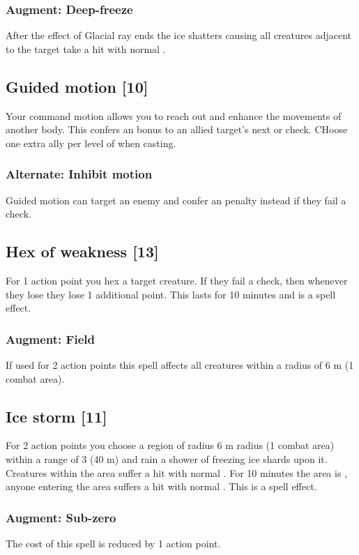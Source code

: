 \subsubsection{Augment: Deep-freeze}
After the effect of Glacial ray ends the ice shatters causing all creatures adjacent to the target take a hit with normal .

\subsection{Guided motion [10]}
Your command motion allows you to reach out and enhance the movements of another body. This confers an  bonus to an allied target's next  or  check. CHoose one extra ally per level of  when casting.
\subsubsection{Alternate: Inhibit motion}
Guided motion can target an enemy and confer an  penalty instead if they fail a  check.

\subsection{Hex of weakness [13]}
For 1 action point you hex a target creature. If they fail a  check, then whenever they lose  they lose 1 additional point. This lasts for 10 minutes and  is a  spell effect.

\subsubsection{Augment: Field}
If used for 2 action points this spell affects all creatures within a radius of 6 m (1 combat area).

\subsection{Ice storm [11]}
For 2 action points you choose a region of radius 6 m radius (1 combat area) within a range of 3 (40 m) and rain a shower of freezing ice shards upon it. Creatures within the area suffer a hit with normal . For 10 minutes the area is , anyone entering the area suffers a hit with normal . This is a  spell effect.
\subsubsection{Augment: Sub-zero}
The cost of this spell is reduced by 1 action point.

